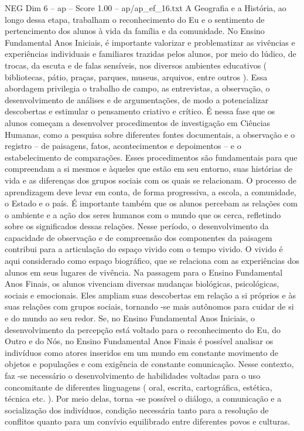 \begin{textsample}{NEG Dim 6 – ap – Score 1.00 – ap/ap\_ef\_16.txt}
A Geografia e a História, ao longo dessa etapa, trabalham o reconhecimento do Eu e o sentimento de pertencimento dos alunos à vida da família e da comunidade.
No Ensino Fundamental Anos Iniciais, é importante valorizar e problematizar as vivências e experiências individuais e familiares trazidas pelos alunos, por meio do lúdico, de trocas, da escuta e de falas sensíveis, nos diversos ambientes educativos ( bibliotecas, pátio, praças, parques, museus, arquivos, entre outros ).
Essa abordagem privilegia o trabalho de campo, as entrevistas, a observação, o desenvolvimento de análises e de argumentações, de modo a potencializar descobertas e estimular o pensamento criativo e crítico.
É nessa fase que os alunos começam a desenvolver procedimentos de investigação em Ciências Humanas, como a pesquisa sobre diferentes fontes documentais, a observação e o registro – de paisagens, fatos, acontecimentos e depoimentos – e o estabelecimento de comparações.
Esses procedimentos são fundamentais para que compreendam a si mesmos e àqueles que estão em seu entorno, suas histórias de vida e as diferenças dos grupos sociais com os quais se relacionam.
O processo de aprendizagem deve levar em conta, de forma progressiva, a escola, a comunidade, o Estado e o país.
É importante também que os alunos percebam as relações com o ambiente e a ação dos seres humanos com o mundo que os cerca, refletindo sobre os significados dessas relações.
Nesse período, o desenvolvimento da capacidade de observação e de compreensão dos componentes da paisagem contribui para a articulação do espaço vivido com o tempo vivido.
O vivido é aqui considerado como espaço biográfico, que se relaciona com as experiências dos alunos em seus lugares de vivência.
Na passagem para o Ensino Fundamental Anos Finais, os alunos vivenciam diversas mudanças biológicas, psicológicas, sociais e emocionais.
Eles ampliam suas descobertas em relação a si próprios e às suas relações com grupos sociais, tornando -se mais autônomos para cuidar de si e do mundo ao seu redor.
Se, no Ensino Fundamental Anos Iniciais, o desenvolvimento da percepção está voltado para o reconhecimento do Eu, do Outro e do Nós, no Ensino Fundamental Anos Finais é possível analisar os indivíduos como atores inseridos em um mundo em constante movimento de objetos e populações e com exigência de constante comunicação.
Nesse contexto, faz -se necessário o desenvolvimento de habilidades voltadas para o uso concomitante de diferentes linguagens ( oral, escrita, cartográfica, estética, técnica etc. ).
Por meio delas, torna -se possível o diálogo, a comunicação e a socialização dos indivíduos, condição necessária tanto para a resolução de conflitos quanto para um convívio equilibrado entre diferentes povos e culturas.

\end{textsample}
